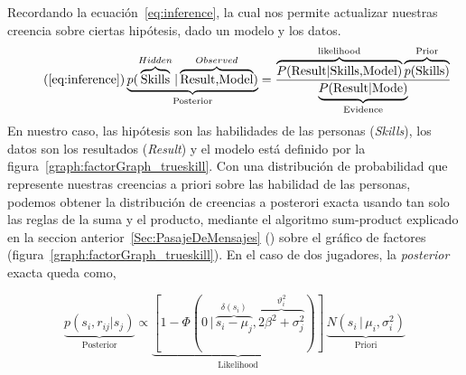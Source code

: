 \documentclass[11pt,twoside,spanish]{report} %
\begin{document}
Recordando la ecuaci\'on~\ref{eq:inference}, la cual nos permite actualizar nuestras creencia sobre ciertas hip\'otesis, dado un modelo y los datos.
\begin{equation}\tag{\ref{eq:inference}}
\underbrace{p(\overbrace{\text{Skills}}^{Hidden}|\overbrace{\text{Result,Model}}^{Observed})}_{\text{Posterior}} = \frac{\overbrace{P(\text{Result}|\text{Skills,Model})}^{\text{likelihood}}\overbrace{p(\text{Skills})}^{\text{Prior}}}{\underbrace{P(\text{Result}|\text{Mode})}_{\text{Evidence}}}
\end{equation}
En nuestro caso, las hip\'otesis son las habilidades de las personas (\textit{Skills}), los datos son los resultados (\textit{Result}) y el modelo est\'a definido por la figura~\ref{graph:factorGraph_trueskill}.
Con una distribuci\'on de probabilidad que represente nuestras creencias a priori sobre las habilidad de las personas, podemos obtener la distribuci\'on de creencias a posterori exacta usando tan solo las reglas de la suma y el producto, mediante el algoritmo sum-product explicado en la seccion anterior~\ref{Sec:PasajeDeMensajes} ()  sobre el gr\'afico de factores (figura~\ref{graph:factorGraph_trueskill}).
En el caso de dos jugadores, la \textit{posterior} exacta queda como,

\begin{equation}\label{eq:bayesaprox}
\underbrace{p(s_i, r_{ij}| s_j)}_{\text{Posterior}} \propto
 \underbrace{[1 - \Phi(0 \, | \, \overbrace{s_i - \mu_j}^{\delta(s_i)},  \overbrace{ 2\beta^2 + \sigma_j^2}^{\vartheta_i^2})]}_{\text{Likelihood}} \,  \underbrace{N(s_i \, | \, \mu_i, \sigma_i^2 )}_{\text{Priori}}
\end{equation}

\end{document}
